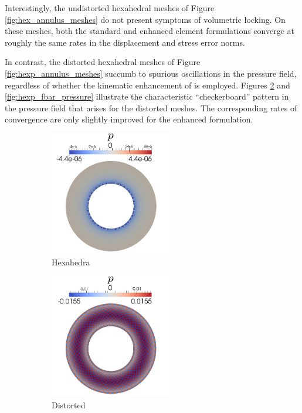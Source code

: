 Interestingly, the undistorted hexahedral meshes of Figure \ref{fig:hex_annulus_meshes} do not present symptoms of volumetric locking. On these meshes, both the standard and enhanced element formulations converge at roughly the same rates in the displacement and stress error norms.

In contrast, the distorted hexahedral meshes of Figure \ref{fig:hexp_annulus_meshes} succumb to spurious oscillations in the pressure field, regardless of whether the kinematic enhancement of \cite{Rashid:06} is employed. Figures \ref{fig:hexp_pressure} and \ref{fig:hexp_fbar_pressure} illustrate the characteristic ``checkerboard'' pattern in the pressure field that arises for the distorted meshes. The corresponding rates of convergence are only slightly improved for the enhanced formulation.

\begin{figure}[!h]
  \centering
    \begin{subfigure}[b]{0.32\linewidth}
            \centering
            \includegraphics[width=2.1in]{figures/hex_pressure.pdf}
    			\caption{Hexahedra \label{fig:hex_pressure}}
    \end{subfigure}
	\begin{subfigure}[b]{0.32\linewidth}
            \centering
            \includegraphics[width=2.1in]{figures/hexp_pressure.pdf}
    			\caption{Distorted \label{fig:hexp_pressure}}
    \end{subfigure} 
    \begin{subfigure}[b]{0.32\linewidth}

\end{subfigure}
\end{figure}
